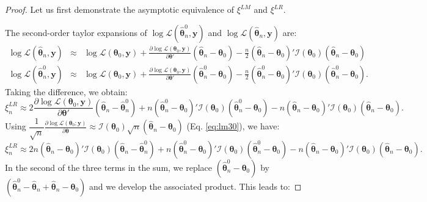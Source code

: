 \documentclass[
  12pt,
]{book}
\theoremstyle{definition}
\theoremstyle{definition}
\theoremstyle{definition}
\theoremstyle{definition}
\theoremstyle{remark}
\begin{document}
\begin{proof}
Let us first demonstrate the asymptotic equivalence of \(\xi^{LM}\) and \(\xi^{LR}\).

The second-order taylor expansions of \(\log \mathcal{L}(\hat{\boldsymbol\theta}^0_n,\mathbf{y})\) and \(\log \mathcal{L}(\hat{\boldsymbol\theta}_n,\mathbf{y})\) are:
\begin{eqnarray*}
\log \mathcal{L}(\hat{\boldsymbol\theta}_n,\mathbf{y}) &\approx& \log \mathcal{L}(\boldsymbol\theta_0,\mathbf{y})
+ \frac{\partial \log \mathcal{L}(\boldsymbol\theta_0,\mathbf{y})}{\partial \boldsymbol\theta'}(\hat{\boldsymbol\theta}_n-\boldsymbol\theta_0)
- \frac{n}{2} (\hat{\boldsymbol\theta}_n-\boldsymbol\theta_0)' \mathcal{I}(\boldsymbol\theta_0) (\hat{\boldsymbol\theta}_n-\boldsymbol\theta_0)\\
\log \mathcal{L}(\hat{\boldsymbol\theta}^0_n,\mathbf{y}) &\approx& \log \mathcal{L}(\boldsymbol\theta_0,\mathbf{y})
+ \frac{\partial \log \mathcal{L}(\boldsymbol\theta_0,\mathbf{y})}{\partial \boldsymbol\theta'}(\hat{\boldsymbol\theta}^0_n-\boldsymbol\theta_0)
- \frac{n}{2} (\hat{\boldsymbol\theta}^0_n-\boldsymbol\theta_0)' \mathcal{I}(\boldsymbol\theta_0) (\hat{\boldsymbol\theta}^0_n-\boldsymbol\theta_0).
\end{eqnarray*}
Taking the difference, we obtain:
\[
\xi_n^{LR} \approx 2\frac{\partial \log \mathcal{L}(\boldsymbol\theta_0,\mathbf{y})}{\partial \boldsymbol\theta'}
(\hat{\boldsymbol\theta}_n-\hat{\boldsymbol\theta}^0_n) + n (\hat{\boldsymbol\theta}^0_n-\boldsymbol\theta_0)' \mathcal{I}(\boldsymbol\theta_0) (\hat{\boldsymbol\theta}^0_n-\boldsymbol\theta_0) - n (\hat{\boldsymbol\theta}_n-\boldsymbol\theta_0)' \mathcal{I}(\boldsymbol\theta_0) (\hat{\boldsymbol\theta}_n-\boldsymbol\theta_0).
\]
Using \(\dfrac{1}{\sqrt{n}}\frac{\partial \log \mathcal{L}(\boldsymbol\theta_0;\mathbf{y})}{\partial \boldsymbol\theta} \approx \mathcal{I}(\boldsymbol\theta_0)\sqrt{n}(\hat{\boldsymbol\theta}_n-\boldsymbol\theta_0)\) (Eq. \eqref{eq:lm30}), we have:
\[
\xi_n^{LR} \approx
2n(\hat{\boldsymbol\theta}_n-\boldsymbol\theta_0)'\mathcal{I}(\boldsymbol\theta_0)
(\hat{\boldsymbol\theta}_n-\hat{\boldsymbol\theta}^0_n)
+ n (\hat{\boldsymbol\theta}^0_n-\boldsymbol\theta_0)' \mathcal{I}(\boldsymbol\theta_0) (\hat{\boldsymbol\theta}^0_n-\boldsymbol\theta_0) - n (\hat{\boldsymbol\theta}_n-\boldsymbol\theta_0)' \mathcal{I}(\boldsymbol\theta_0) (\hat{\boldsymbol\theta}_n-\boldsymbol\theta_0).
\]
In the second of the three terms in the sum, we replace \((\hat{\boldsymbol\theta}^0_n-\boldsymbol\theta_0)\) by \((\hat{\boldsymbol\theta}^0_n-\hat{\boldsymbol\theta}_n+\hat{\boldsymbol\theta}_n-\boldsymbol\theta_0)\) and we develop the associated product. This leads to:

\end{proof}
\end{document}
